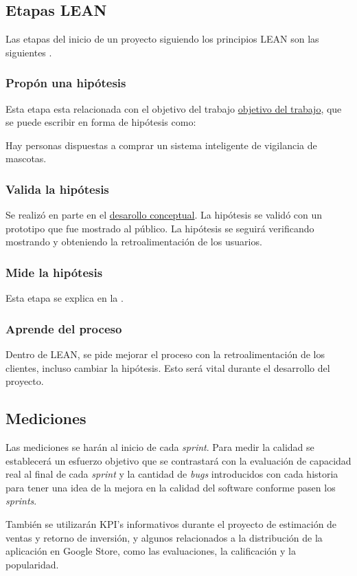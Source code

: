 \subsection{Etapas LEAN}

Las etapas del inicio de un proyecto siguiendo los principios LEAN son las siguientes \parencite{cardenas}.

\subsubsection{Propón una hipótesis}

Esta etapa esta relacionada con el objetivo del trabajo \hyperref[sec:objetivos]{objetivo del trabajo}, que se puede escribir en forma de hipótesis como:

\begin{quotebox}
Hay personas dispuestas a comprar un sistema inteligente de vigilancia de mascotas.
\end{quotebox}

\subsubsection{Valida la hipótesis}

Se realizó en parte en el \hyperref[sec:desarrolloconceptual]{desarollo conceptual}. La hipótesis se validó con un prototipo que fue mostrado al público. La hipótesis se seguirá verificando mostrando y obteniendo la retroalimentación de los usuarios.

\subsubsection{Mide la hipótesis}

Esta etapa se explica en la .

\subsubsection{Aprende del proceso}

Dentro de LEAN, se pide mejorar el proceso con la retroalimentación de los clientes, incluso cambiar la hipótesis. Esto será vital durante el desarrollo del proyecto.

\subsection{Mediciones}
\label{sec:mediciones}

Las mediciones se harán al inicio de cada \textit{sprint}. Para medir la calidad se establecerá un esfuerzo objetivo que se contrastará con la evaluación de capacidad real al final de cada \textit{sprint} y la cantidad de \textit{bugs} introducidos con cada historia para tener una idea de la mejora en la calidad del software conforme pasen los \textit{sprints}.

También se utilizarán KPI's informativos durante el proyecto de estimación de ventas y retorno de inversión, y algunos relacionados a la distribución de la aplicación en Google Store, como las evaluaciones, la calificación y la popularidad.









